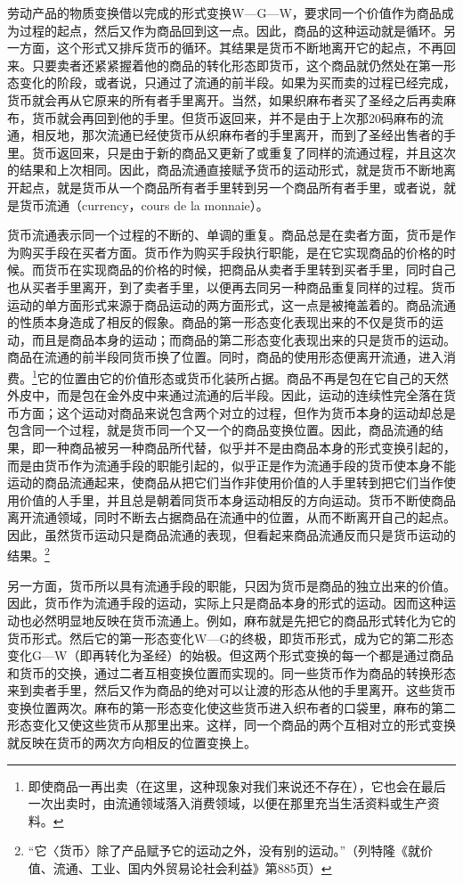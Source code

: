 \documentclass{ctexbook}
\begin{document}
        劳动产品的物质变换借以完成的形式变换W—G—W，要求同一个价值作为商品成为过程的起点，然后又作为商品回到这一点。因此，商品的这种运动就是循环。另一方面，这个形式又排斥货币的循环。其结果是货币不断地离开它的起点，不再回来。只要卖者还紧紧握着他的商品的转化形态即货币，这个商品就仍然处在第一形态变化的阶段，或者说，只通过了流通的前半段。如果为买而卖的过程已经完成，货币就会再从它原来的所有者手里离开。当然，如果织麻布者买了圣经之后再卖麻布，货币就会再回到他的手里。但货币返回来，并不是由于上次那20码麻布的流通，相反地，那次流通已经使货币从织麻布者的手里离开，而到了圣经出售者的手里。货币返回来，只是由于新的商品又更新了或重复了同样的流通过程，并且这次的结果和上次相同。因此，商品流通直接赋予货币的运动形式，就是货币不断地离开起点，就是货币从一个商品所有者手里转到另一个商品所有者手里，或者说，就是货币流通（currency，cours de la monnaie）。
        
        货币流通表示同一个过程的不断的、单调的重复。商品总是在卖者方面，货币是作为购买手段在买者方面。货币作为购买手段执行职能，是在它实现商品的价格的时候。而货币在实现商品的价格的时候，把商品从卖者手里转到买者手里，同时自己也从买者手里离开，到了卖者手里，以便再去同另一种商品重复同样的过程。货币运动的单方面形式来源于商品运动的两方面形式，这一点是被掩盖着的。商品流通的性质本身造成了相反的假象。商品的第一形态变化表现出来的不仅是货币的运动，而且是商品本身的运动；而商品的第二形态变化表现出来的只是货币的运动。商品在流通的前半段同货币换了位置。同时，商品的使用形态便离开流通，进入消费。\footnote{即使商品一再出卖（在这里，这种现象对我们来说还不存在），它也会在最后一次出卖时，由流通领域落入消费领域，以便在那里充当生活资料或生产资料。}它的位置由它的价值形态或货币化装所占据。商品不再是包在它自己的天然外皮中，而是包在金外皮中来通过流通的后半段。因此，运动的连续性完全落在货币方面；这个运动对商品来说包含两个对立的过程，但作为货币本身的运动却总是包含同一个过程，就是货币同一个又一个的商品变换位置。因此，商品流通的结果，即一种商品被另一种商品所代替，似乎并不是由商品本身的形式变换引起的，而是由货币作为流通手段的职能引起的，似乎正是作为流通手段的货币使本身不能运动的商品流通起来，使商品从把它们当作非使用价值的人手里转到把它们当作使用价值的人手里，并且总是朝着同货币本身运动相反的方向运动。货币不断使商品离开流通领域，同时不断去占据商品在流通中的位置，从而不断离开自己的起点。因此，虽然货币运动只是商品流通的表现，但看起来商品流通反而只是货币运动的结果。\footnote{“它〈货币〉除了产品赋予它的运动之外，没有别的运动。”（列特隆《就价值、流通、工业、国内外贸易论社会利益》第885页）}
        
        另一方面，货币所以具有流通手段的职能，只因为货币是商品的独立出来的价值。因此，货币作为流通手段的运动，实际上只是商品本身的形式的运动。因而这种运动也必然明显地反映在货币流通上。例如，麻布就是先把它的商品形式转化为它的货币形式。然后它的第一形态变化W—G的终极，即货币形式，成为它的第二形态变化G—W（即再转化为圣经）的始极。但这两个形式变换的每一个都是通过商品和货币的交换，通过二者互相变换位置而实现的。同一些货币作为商品的转换形态来到卖者手里，然后又作为商品的绝对可以让渡的形态从他的手里离开。这些货币变换位置两次。麻布的第一形态变化使这些货币进入织布者的口袋里，麻布的第二形态变化又使这些货币从那里出来。这样，同一个商品的两个互相对立的形式变换就反映在货币的两次方向相反的位置变换上。
        
\end{document}
